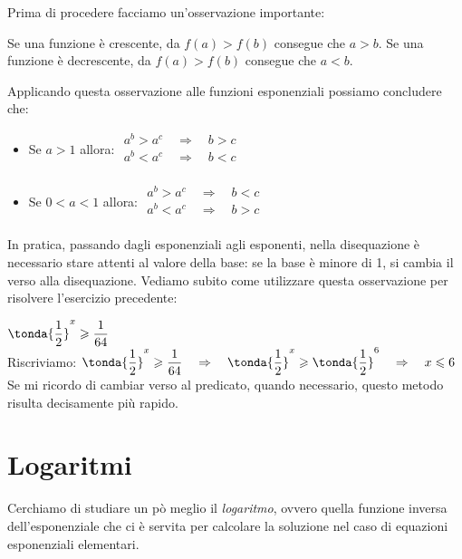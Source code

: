 Prima di procedere facciamo un'osservazione importante: 

\begin{osservazione}
Se una funzione è crescente, da \(f(a)>f(b)\) consegue che \(a>b\).
Se una funzione è decrescente, da \(f(a)>f(b)\) consegue che \(a<b\).
\end{osservazione}
Applicando questa osservazione alle funzioni esponenziali possiamo 
concludere che:

\begin{itemize}
 \item Se $a>1$ allora: \quad $\begin{matrix}
 a^b>a^c \quad \Rightarrow \quad b>c \\
 a^b<a^c \quad \Rightarrow \quad b<c \\
\end{matrix}$
 \item Se $0<a<1$ allora: \quad $\begin{matrix}
 a^b>a^c \quad \Rightarrow \quad b<c \\
 a^b<a^c \quad \Rightarrow \quad b>c \\
\end{matrix}$
\end{itemize}
In pratica, passando dagli esponenziali agli esponenti, nella disequazione è necessario stare attenti
al valore della base: se la base è minore di 1, si cambia il verso alla disequazione. 
Vediamo subito come utilizzare questa osservazione per risolvere l'esercizio precedente:


\begin{esempio}
 \(\tonda{\dfrac{1}{2}}^x \geqslant \dfrac{1}{64}\)\\[4pt]
 Riscriviamo:  \(\tonda{\dfrac{1}{2}}^x \geqslant \dfrac{1}{64} \quad\Rightarrow\quad
    \tonda{\dfrac{1}{2}}^x \geqslant \tonda{\dfrac{1}{2}}^6 \quad\Rightarrow\quad 
    x \leqslant 6\)
\\[6pt]
Se mi ricordo di cambiar verso al predicato, quando necessario, questo metodo 
risulta decisamente più rapido.
\end{esempio}

\newpage %

\section{Logaritmi}
\label{sec:esplog_logaritmi}

Cerchiamo di studiare un pò meglio il \emph{logaritmo}, ovvero quella funzione inversa
dell'esponenziale che ci è servita per calcolare la soluzione nel caso di equazioni esponenziali elementari.

